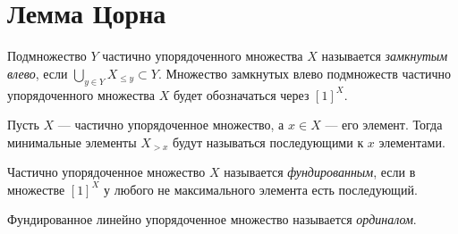 \documentclass[
	extrafontsizes,
	11pt,
	hyphens,
]{memoir}
\begin{document}
\section{Лемма Цорна}


\begin{definition}
Подмножество \(Y\) частично упорядоченного множества \(X\) называется \emph{замкнутым влево}, если \(\bigcup_{y \in Y} X_{\leq y} \subset Y\).
Множество замкнутых влево подмножеств частично упорядоченного множества \(X\) будет обозначаться через \([1]^X\).
\end{definition}



\begin{definition}
Пусть \(X\) --- частично упорядоченное множество, а \(x \in X\) --- его элемент. Тогда минимальные элементы \(X_{> x}\) будут называться последующими к \(x\) элементами.
\end{definition}

\begin{definition}
Частично упорядоченное множество \(X\) называется \emph{фундированным}, если в множестве \([1]^X\) у любого не максимального элемента есть последующий.
\end{definition}

\begin{definition}
Фундированное линейно упорядоченное множество называется \emph{ординалом}.
\end{definition}
\end{document}
